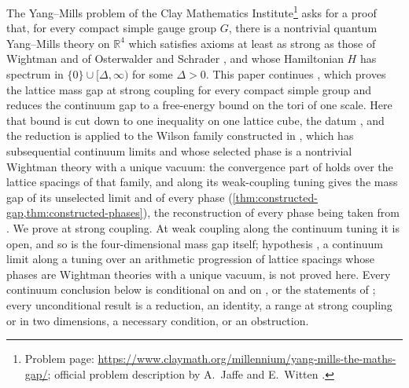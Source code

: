 \documentclass[11pt,a4paper]{amsart}
\theoremstyle{definition}
\theoremstyle{remark}
\numberwithin{equation}{section}
\newcommand{\R}{\mathbb{R}}          %
\newcommand{\Mcirc}{\text{\upshape(M$^{\circ}$)}}   %
\newcommand{\hypW}{\text{\upshape(W)}}              %
\newcommand{\UVB}{\text{\upshape(UVB)}}             %
\begin{document}
The Yang--Mills problem of the Clay Mathematics Institute\footnote{Problem page: \url{https://www.claymath.org/millennium/yang-mills-the-maths-gap/}; official problem description by A.~Jaffe and E.~Witten \cite{jaffe2006}.} asks for a proof that, for every compact simple gauge group $G$, there is a nontrivial quantum Yang--Mills theory on $\R^4$ which satisfies axioms at least as strong as those of Wightman \cite{wightman1956} and of Osterwalder and Schrader \cite{osterwalder1973,osterwalder1975}, and whose Hamiltonian $H$ has spectrum in $\{0\}\cup[\Delta,\infty)$ for some $\Delta>0$. This paper continues \cite{bhattacharjee2026first}, which proves the lattice mass gap at strong coupling for every compact simple group and reduces the continuum gap to a free-energy bound on the tori of one scale. Here that bound is cut down to one inequality on one lattice cube, the datum \Mcirc, and the reduction is applied to the Wilson family constructed in \cite{openaiym}, which has subsequential continuum limits and whose selected phase is a nontrivial Wightman theory with a unique vacuum: the convergence part of \hypW{} holds over the lattice spacings of that family, and \Mcirc{} along its weak-coupling tuning gives the mass gap of its unselected limit and of every phase (\cref{thm:constructed-gap,thm:constructed-phases}), the reconstruction of every phase being taken from \cite{ymgroup2026}. We prove \Mcirc{} at strong coupling. At weak coupling along the continuum tuning it is open, and so is the four-dimensional mass gap itself; hypothesis \hypW{}, a continuum limit along a tuning over an arithmetic progression of lattice spacings whose phases are Wightman theories with a unique vacuum, is not proved here. Every continuum conclusion below is conditional on \Mcirc{} and on \hypW, \UVB{} or the statements of \cite{openaiym}; every unconditional result is a reduction, an identity, a range at strong coupling or in two dimensions, a necessary condition, or an obstruction.
\end{document}
